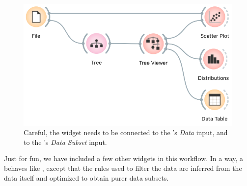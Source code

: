 \begin{figure}[h]
    \centering
    \includegraphics[scale=0.4]{workflow-inspection.png}
    \caption{Careful, the  widget needs to be connected to the 's \textit{Data} input, and  to the 's \textit{Data Subset} input.}
\end{figure}

Just for fun, we have included a few other widgets in this workflow. In a way, a  behaves like , except that the rules used to filter the data are inferred from the data itself and optimized to obtain purer data subsets.

